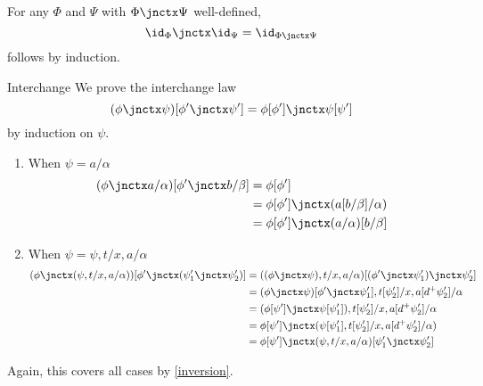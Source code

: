 \begin{lemma}
  \label{lem:sq-vid-hcomp}
  For any $\Phi$ and $\Psi$ with $\Phi\jnctx \Psi$ well-defined,
  \[ \id_\Phi \jnctx \id_\Psi = \id_{\Phi\jnctx\Psi} \]
  follows by induction.
\end{lemma}

\begin{lemma}{Interchange}
  \label{lem:sq-vcomp-hcomp}
  We prove the interchange law
  $$(\phi\jnctx\psi)[\phi'\jnctx\psi'] = \phi[\phi'] \jnctx \psi[\psi']$$
  by induction on $\psi$.

  \begin{enumerate}
  \item When $\psi=a/\alpha$
      \begin{align*}
    (\phi\jnctx a/\alpha)[\phi'\jnctx b/\beta]
        &= \phi[\phi']\\
        &= \phi[\phi'] \jnctx (a[b/\beta]/\alpha)\\
        &= \phi[\phi'] \jnctx (a/\alpha)[b/\beta]
  \end{align*}
    \item When $\psi=\psi,t/x,a/\alpha$
      \begin{align*}
        (\phi\jnctx (\psi,t/x,a/\alpha))[\phi' \jnctx (\psi'_1\jnctx\psi'_2)]
        &= ((\phi\jnctx \psi),t/x,a/\alpha)[(\phi' \jnctx \psi'_1)\jnctx\psi'_2]\\
        &= (\phi\jnctx \psi)[\phi' \jnctx \psi'_1],t[\psi'_2]/x,a[d^+\psi'_2]/\alpha\\
        &= (\phi[\psi'] \jnctx \psi[\psi'_1]),t[\psi'_2]/x,a[d^+\psi'_2]/\alpha\\
        &= \phi[\psi'] \jnctx (\psi[\psi'_1],t[\psi'_2]/x,a[d^+\psi'_2]/\alpha)\\
        &= \phi[\psi'] \jnctx (\psi,t/x,a/\alpha)[\psi'_1\jnctx \psi'_2]
      \end{align*}
  \end{enumerate}
  Again, this covers all cases by \cref{inversion}.
\end{lemma}



